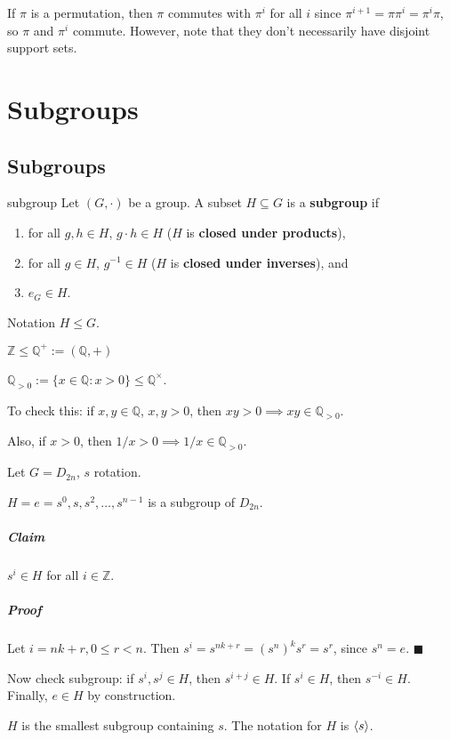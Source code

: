 If $\pi$ is a permutation, then $\pi$ commutes with $\pi^i$ for all $i$ since $\pi^{i+1}=\pi \pi^i = \pi^i \pi$, so $\pi$ and $\pi^i$ commute. However, note that they don't necessarily have disjoint support sets.

\chapter{Subgroups}
\section{Subgroups}

\begin{defn}{subgroup}
Let $(G,\cdot)$ be a group. A subset $H\subseteq G$ is a \textbf{subgroup} if
\begin{enumerate}[label=(\alph*)]
\item for all $g,h\in H$, $g\cdot h\in H$ ($H$ is \textbf{closed under products}),
\item for all $g\in H$, $g^{-1}\in H$ ($H$ is \textbf{closed under inverses}), and
\item $e_G\in H$.
\end{enumerate}
Notation $H\le G$.
\end{defn}

\begin{ex}
$\mathbb Z\le \mathbb Q^+ := (\mathbb Q, +)$

$\mathbb Q_{>0}:= \{x\in\mathbb Q:x>0\} \le \mathbb Q^\times$.

To check this: if $x,y\in \mathbb Q$, $x,y>0$, then $xy>0 \implies xy\in \mathbb Q_{>0}$.

Also, if $x>0$, then $1/x>0\implies 1/x \in \mathbb Q_{>0}.$
\end{ex}

\begin{ex}
Let $G=D_{2n}$, $s$ rotation.

$H={e=s^0, s,s^2,\ldots,s^{n-1}}$ is a subgroup of $D_{2n}$.



\begin{pf}
\paragraph{Claim} $s^i\in H$ for all $i\in\mathbb Z$.
\paragraph{Proof} Let $i=nk+r,0\le r < n$. Then $s^i=s^{nk+r}=(s^n)^k s^r=s^r$, since $s^n=e$. \hfill $\blacksquare$ 

Now check subgroup: if $s^i, s^j \in H$, then $s^{i+j}\in H$. If $s^i\in H$, then $s^{-i}\in H$. Finally, $e\in H$ by construction.
\end{pf}

$H$ is the smallest subgroup containing $s$. The notation for $H$ is $\left\langle s \right\rangle$.
\end{ex}

